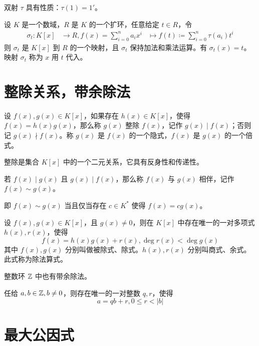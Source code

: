 双射 $\tau$ 具有性质：$\tau(1) = 1'$。

\begin{theorem}
    设 $K$ 是一个数域，$R$ 是 $K$ 的一个扩环，任意给定 $t\in R$，令
    \begin{equation*}
        \begin{aligned}
            \sigma_t : K[x] &\to R, f(x) = \sum_{i=0}^n a_ix^i &\mapsto f(t) \coloneqq  \sum_{i=0}^n \tau(a_i)t^i
        \end{aligned}
    \end{equation*}
    则 $\sigma_t$ 是 $K[x]$ 到 $R$ 的一个映射，且 $\sigma_t$ 保持加法和乘法运算。有 $\sigma_t(x) = t$。映射 $\sigma_t$ 称为 $x$ 用 $t$ 代入。
\end{theorem}

\section{整除关系，带余除法}

设 $f(x), g(x) \in K[x]$，如果存在 $h(x) \in K[x]$，使得 $f(x) = h(x)g(x)$，那么称 $g(x)$ 整除 $f(x)$，记作 $g(x) \mid f(x)$；否则记 $g(x) \nmid f(x)$。称 $g(x)$ 是 $f(x)$ 的一个隐式，$f(x)$ 是 $g(x)$ 的一个倍式。

整除是集合 $K[x]$ 中的一个二元关系，它具有反身性和传递性。

\begin{definition}
    若 $f(x) \mid g(x)$ 且 $g(x) \mid f(x)$，那么称 $f(x)$ 与 $g(x)$ 相伴，记作 $f(x) \sim g(x)$。
\end{definition}

即 $f(x) \sim g(x)$ 当且仅当存在 $c \in K^*$ 使得 $f(x) = cg(x)$。

\begin{definition}[带余除法]
    设 $f(x), g(x) \in K[x]$，且 $g(x) \ne 0$，则在 $K[x]$ 中存在唯一的一对多项式 $h(x), r(x)$，使得
    \[f(x) = h(x)g(x) + r(x), \deg r(x) < \deg g(x)\]
    其中 $f(x), g(x)$ 分别叫做被除式、除式。$h(x),r(x)$ 分别叫商式、余式。此式称为除法算式。
\end{definition}

整数环 $\mathbb{Z}$ 中也有带余除法。

\begin{theorem}
    任给 $a,b\in \mathbb{Z}, b\ne 0$，则存在唯一的一对整数 $q,r$，使得
    \[a = qb + r, 0 \leqslant r < |b|\]
\end{theorem}

\section{最大公因式}


